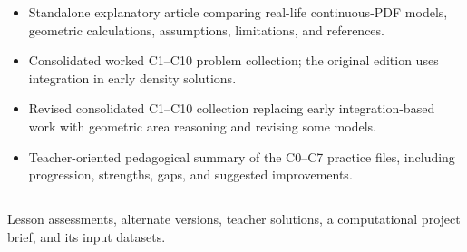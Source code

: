 \begin{itemize}
  Student-facing C7 inverse-normal applications for upper/lower percentiles and symmetric central intervals in real contexts.

  \item {}

  Standalone explanatory article comparing real-life continuous-PDF models, geometric calculations, assumptions, limitations, and references.

  \item {}

  Consolidated worked C1–C10 problem collection; the original edition uses integration in early density solutions.

  \item {}

  Revised consolidated C1–C10 collection replacing early integration-based work with geometric area reasoning and revising some models.

  \item {}

  Teacher-oriented pedagogical summary of the C0–C7 practice files, including progression, strengths, gaps, and suggested improvements.
\end{itemize}

\subsection{}

Lesson assessments, alternate versions, teacher solutions, a computational project brief, and its input datasets.


